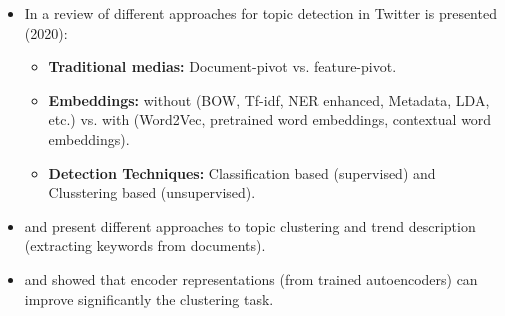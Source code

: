 \begin{itemize}
    \item In \cite{ReviewApproachesTopcicDetection} a review of different approaches for topic detection in Twitter is presented (2020):
    \begin{itemize}
        \item \textbf{Traditional medias:} Document-pivot vs. feature-pivot.
        
        \item \textbf{Embeddings:} without (BOW, Tf-idf, NER enhanced, Metadata, LDA, etc.) vs. with (Word2Vec, pretrained word embeddings, contextual word embeddings).
        
        \item \textbf{Detection Techniques:} Classification based (supervised) and Clusstering based (unsupervised).
    \end{itemize}
    
\item \cite{TrendTopicsDetectionFromTwitter} and \cite{FuzzyIncrementalTopicDetection} present different approaches to topic clustering and trend description (extracting keywords from documents).
    
\item  \cite{DeepRepresentationClusteringTweets} and \cite{UnsupervisedDeepEmbeddingClustering} showed that encoder representations (from trained autoencoders) can improve significantly the clustering task.
\end{itemize}